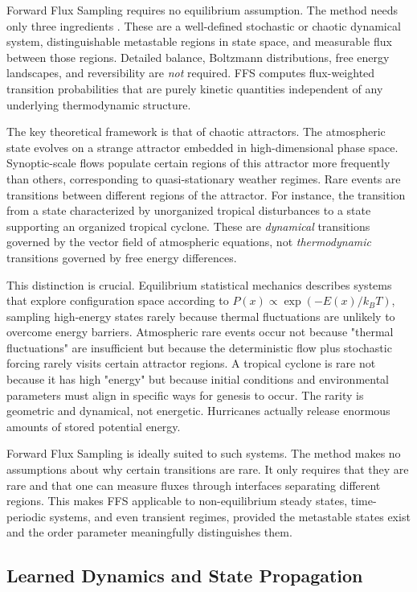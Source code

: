 \documentclass[11pt]{article}
\begin{document}
Forward Flux Sampling requires no equilibrium assumption. The method needs only three ingredients \citep{allen2009forward}. These are a well-defined stochastic or chaotic dynamical system, distinguishable metastable regions in state space, and measurable flux between those regions. Detailed balance, Boltzmann distributions, free energy landscapes, and reversibility are \textit{not} required. FFS computes flux-weighted transition probabilities that are purely kinetic quantities independent of any underlying thermodynamic structure.

The key theoretical framework is that of chaotic attractors. The atmospheric state evolves on a strange attractor embedded in high-dimensional phase space. Synoptic-scale flows populate certain regions of this attractor more frequently than others, corresponding to quasi-stationary weather regimes. Rare events are transitions between different regions of the attractor. For instance, the transition from a state characterized by unorganized tropical disturbances to a state supporting an organized tropical cyclone. These are \textit{dynamical} transitions governed by the vector field of atmospheric equations, not \textit{thermodynamic} transitions governed by free energy differences.

This distinction is crucial. Equilibrium statistical mechanics describes systems that explore configuration space according to $P(x) \propto \exp(-E(x)/k_BT)$, sampling high-energy states rarely because thermal fluctuations are unlikely to overcome energy barriers. Atmospheric rare events occur not because "thermal fluctuations" are insufficient but because the deterministic flow plus stochastic forcing rarely visits certain attractor regions. A tropical cyclone is rare not because it has high "energy" but because initial conditions and environmental parameters must align in specific ways for genesis to occur. The rarity is geometric and dynamical, not energetic. Hurricanes actually release enormous amounts of stored potential energy.

Forward Flux Sampling is ideally suited to such systems. The method makes no assumptions about why certain transitions are rare. It only requires that they are rare and that one can measure fluxes through interfaces separating different regions. This makes FFS applicable to non-equilibrium steady states, time-periodic systems, and even transient regimes, provided the metastable states exist and the order parameter meaningfully distinguishes them.

\subsection{Learned Dynamics and State Propagation}
\end{document}
